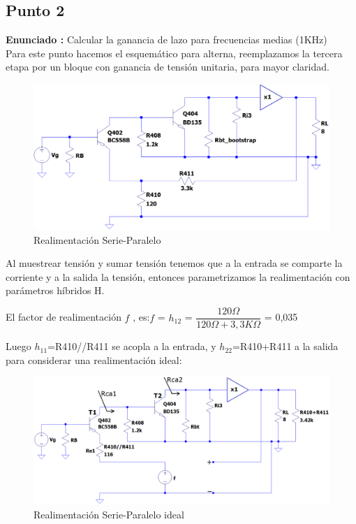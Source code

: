 \documentclass[12pt]{book}
\begin{document}
\subsection{Punto 2}
\textbf{Enunciado : } Calcular la ganancia de lazo para frecuencias medias (1KHz)\\[1cm]
Para este punto hacemos el esquemático para alterna, reemplazamos la tercera etapa por un bloque con ganancia de tensión unitaria, para mayor claridad.\\
\begin{figure}[H]
\centering
\includegraphics[scale=0.4]{figuras/2-lazoCerrado.png}
\caption{Realimentación Serie-Paralelo}
\label{figura2-1}
\end{figure}
Al muestrear tensión y sumar tensión tenemos que a la entrada se comparte la corriente y a la salida la tensión, entonces parametrizamos la realimentación con parámetros híbridos H.
\begin{center}
El factor de realimentación $f$ , es:\qquad $f$ = $h_{12}$ = $\dfrac{120\Omega}{120\Omega+3,3K\Omega}$ = 0,035
\end{center}
Luego $h_{11}$=R410//R411 se acopla a la entrada, y $h_{22}$=R410+R411 a la salida para considerar una realimentación ideal:
\begin{figure}[H]
\centering
\includegraphics[scale=0.4]{figuras/2-lazoCerradoIdeal.png}
\caption{Realimentación Serie-Paralelo ideal}
\label{figura2-2}
\end{figure}
\end{document}
